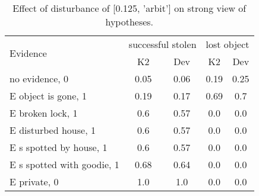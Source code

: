 \begin{table}\begin{tabular}{l|cc|cc}\toprule\multirow{2}{*}{Evidence} & \multicolumn{2}{c}{successful stolen}& \multicolumn{2}{c}{lost object}\\& {K2} & {Dev}& {K2} & {Dev}\\\midrule
no evidence, 0 & 0.05&0.06&\cellcolor{Bittersweet}0.19&\cellcolor{Bittersweet}0.25\\E object is gone, 1 & 0.19&0.17&0.69&0.7\\E broken lock, 1 & 0.6&0.57&0.0&0.0\\E disturbed house, 1 & 0.6&0.57&0.0&0.0\\E s spotted by house, 1 & 0.6&0.57&0.0&0.0\\E s spotted with goodie, 1 & 0.68&0.64&0.0&0.0\\E private, 0 & 1.0&1.0&0.0&0.0\\\bottomrule\end{tabular}\caption{Effect of disturbance of [0.125, 'arbit'] on strong view of hypotheses.}\end{table}